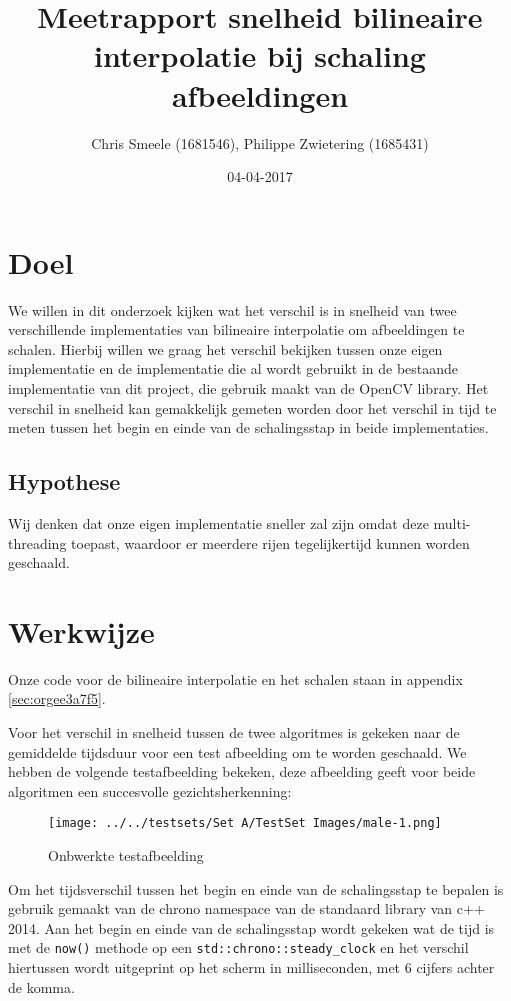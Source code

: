 \documentclass[a4paper]{article}
\author{Chris Smeele (1681546), Philippe Zwietering (1685431)}
\date{04-04-2017}
\title{Meetrapport snelheid bilineaire interpolatie bij schaling afbeeldingen}
\begin{document}
\maketitle
\setcounter{tocdepth}{2}
\tableofcontents


\section{Doel}
\label{sec:orgce2d2ac}
We willen in dit onderzoek kijken wat het verschil is in snelheid van twee verschillende implementaties van bilineaire interpolatie om afbeeldingen te schalen. Hierbij willen we graag het verschil bekijken tussen onze eigen implementatie en de implementatie die al wordt gebruikt in de bestaande implementatie van dit project, die gebruik maakt van de OpenCV library. Het verschil in snelheid kan gemakkelijk gemeten worden door het verschil in tijd te meten tussen het begin en einde van de schalingsstap in beide implementaties.

\subsection{Hypothese}
\label{sec:org56664ab}
Wij denken dat onze eigen implementatie sneller zal zijn omdat deze multi-threading toepast, waardoor er meerdere rijen tegelijkertijd kunnen worden geschaald.

\section{Werkwijze}
\label{sec:org036ab5d}
Onze code voor de bilineaire interpolatie en het schalen staan in appendix \ref{sec:orgee3a7f5}.

Voor het verschil in snelheid tussen de twee algoritmes is gekeken naar de gemiddelde tijdsduur voor een test afbeelding om te worden geschaald. We hebben de volgende testafbeelding bekeken, deze afbeelding geeft voor beide algoritmen een succesvolle gezichtsherkenning: 

\begin{figure}[htbp]
\centering
\texttt{[image: ../../testsets/Set A/TestSet Images/male-1.png]}
\caption{\label{fig:orgb83015a}
Onbwerkte testafbeelding}
\end{figure}

Om het tijdsverschil tussen het begin en einde van de schalingsstap te bepalen is gebruik gemaakt van de chrono namespace van de standaard library van c++ 2014. Aan het begin en einde van de schalingsstap wordt gekeken wat de tijd is met de \texttt{now()} methode op een \texttt{std::chrono::steady\_clock} en het verschil hiertussen wordt uitgeprint op het scherm in milliseconden, met 6 cijfers achter de komma.
\end{document}
